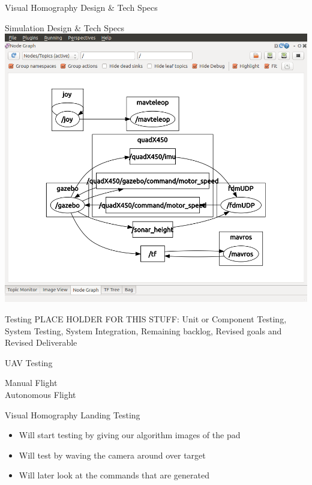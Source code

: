 \documentclass[11pt]{beamer}
\begin{document}
\begin{frame}{Visual Homography Design \& Tech Specs}

\end{frame}

\begin{frame}{Simulation Design \& Tech Specs}
\includegraphics[width=1\textwidth]{images/ardusitl.png}
\end{frame}



\begin{frame}{Testing}
PLACE HOLDER FOR THIS STUFF:
Unit or Component Testing,  System Testing,  System Integration,  Remaining backlog,  Revised goals
and Revised Deliverable
\end{frame}

\begin{frame}{UAV Testing}

Manual Flight \\
Autonomous Flight \\

\end{frame}

\begin{frame}{Visual Homography Landing Testing}
	\begin{itemize}
		\item Will start testing by giving our algorithm images of the pad
		\item Will test by waving the camera around over target
		\item Will later look at the commands that are generated
	\end{itemize}
\end{frame}
\end{document}
